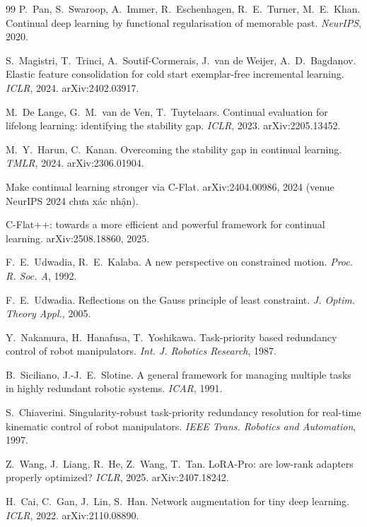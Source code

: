 \begin{thebibliography}{99}
 P.~Pan, S.~Swaroop, A.~Immer, R.~Eschenhagen, R.~E.~Turner, M.~E.~Khan. Continual deep learning by functional regularisation of memorable past. \emph{NeurIPS}, 2020.

 S.~Magistri, T.~Trinci, A.~Soutif-Cormerais, J.~van de Weijer, A.~D.~Bagdanov. Elastic feature consolidation for cold start exemplar-free incremental learning. \emph{ICLR}, 2024. arXiv:2402.03917.

 M.~De Lange, G.~M.~van de Ven, T.~Tuytelaars. Continual evaluation for lifelong learning: identifying the stability gap. \emph{ICLR}, 2023. arXiv:2205.13452.

 M.~Y.~Harun, C.~Kanan. Overcoming the stability gap in continual learning. \emph{TMLR}, 2024. arXiv:2306.01904.

 Make continual learning stronger via C-Flat. arXiv:2404.00986, 2024 (venue NeurIPS 2024 chưa xác nhận).

 C-Flat++: towards a more efficient and powerful framework for continual learning. arXiv:2508.18860, 2025.

 F.~E.~Udwadia, R.~E.~Kalaba. A new perspective on constrained motion. \emph{Proc. R. Soc. A}, 1992.\unv

 F.~E.~Udwadia. Reflections on the Gauss principle of least constraint. \emph{J. Optim. Theory Appl.}, 2005.

 Y.~Nakamura, H.~Hanafusa, T.~Yoshikawa. Task-priority based redundancy control of robot manipulators. \emph{Int. J. Robotics Research}, 1987.\unv

 B.~Siciliano, J.-J.~E.~Slotine. A general framework for managing multiple tasks in highly redundant robotic systems. \emph{ICAR}, 1991.\unv

 S.~Chiaverini. Singularity-robust task-priority redundancy resolution for real-time kinematic control of robot manipulators. \emph{IEEE Trans. Robotics and Automation}, 1997.\unv

 Z.~Wang, J.~Liang, R.~He, Z.~Wang, T.~Tan. LoRA-Pro: are low-rank adapters properly optimized? \emph{ICLR}, 2025. arXiv:2407.18242.

 H.~Cai, C.~Gan, J.~Lin, S.~Han. Network augmentation for tiny deep learning. \emph{ICLR}, 2022. arXiv:2110.08890.


\end{thebibliography}
